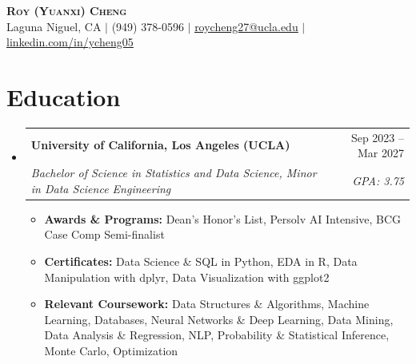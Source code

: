 \documentclass[letterpaper,11pt]{article}
\makeatletter
\newcommand{\resumeItem}[1]{\item\small{#1}}
\newcommand{\resumeSubheading}[4]{
  \vspace{-2pt}\item
    \begin{tabular*}{\textwidth}[t]{l@{\extracolsep{\fill}}r}
      \textbf{#1} & #2 \\
      \textit{\small#3} & \textit{\small #4} \\
    \end{tabular*}\vspace{-7pt}
}
\newcommand{\resumeSubHeadingListStart}{\begin{itemize}[leftmargin=0in, label={}]}
\newcommand{\resumeSubHeadingListEnd}{\end{itemize}}
\newcommand{\resumeItemListStart}{\begin{itemize}[itemsep= 1.5pt, parsep=0pt]}
\newcommand{\resumeItemListEnd}{\end{itemize}\vspace{-5pt}}
\makeatother
\begin{document}
\begin{center}
    \textbf{\LARGE \scshape Roy (Yuanxi) Cheng} \\ \vspace{3pt}
    \small Laguna Niguel, CA $|$ (949) 378-0596 $|$
    \href{mailto:roycheng27@ucla.edu}{\underline{roycheng27@ucla.edu}} $|$
    \href{https://www.linkedin.com/in/ycheng05}{\underline{linkedin.com/in/ycheng05}}
\end{center}
\section{Education}
  \resumeSubHeadingListStart
    \resumeSubheading
      {University of California, Los Angeles (UCLA)}{Sep 2023 -- Mar 2027}
      {Bachelor of Science in Statistics and Data Science, Minor in Data Science Engineering}{GPA: 3.75}
      \resumeItemListStart
        \resumeItem{\textbf{Awards \& Programs:} Dean's Honor's List, Persolv AI Intensive, BCG Case Comp Semi-finalist}
        \resumeItem{\textbf{Certificates:} Data Science \& SQL in Python, EDA in R, Data Manipulation with dplyr, Data Visualization with ggplot2}
        \resumeItem{\textbf{Relevant Coursework:} Data Structures \& Algorithms, Machine Learning, Databases, Neural Networks \& Deep Learning, Data Mining, Data Analysis \& Regression, NLP, Probability \& Statistical Inference, Monte Carlo, Optimization}
      \resumeItemListEnd
  \resumeSubHeadingListEnd
\end{document}
